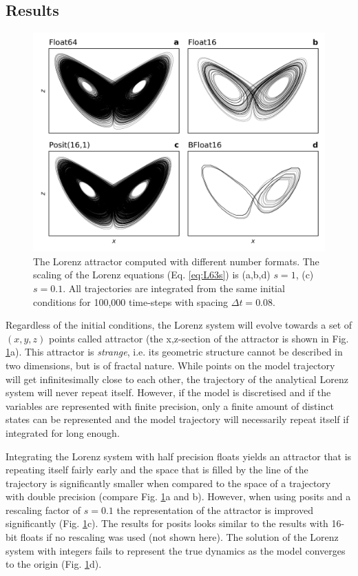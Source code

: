 \documentclass[draft]{agujournal2019}
\begin{document}
\subsection{Results}
\label{sec:lorenz}


\begin{figure}
\includegraphics[width=1\textwidth]{../plots/lorenz_attractor.png}
\caption{The Lorenz attractor computed with different number formats. The scaling of the Lorenz equations (Eq. \ref{eq:L63s}) is (a,b,d) $s=1$, (c) $s=0.1$. All trajectories are integrated from the same initial conditions for 100,000 time-steps with spacing $\Delta t = 0.08$.}
\label{fig:L63}
\end{figure}

Regardless of the initial conditions, the Lorenz system will evolve towards a set of $(x,y,z)$ points called attractor (the x,z-section of the attractor is shown in Fig. \ref{fig:L63}a). This attractor is \emph{strange}, i.e. its geometric structure cannot be described in two dimensions, but is of fractal nature. 
While points on the model trajectory will get infinitesimally close to each other, the trajectory of the analytical Lorenz system will never repeat itself. However, if the model is discretised and if the variables are represented with finite precision, only a finite amount of distinct states can be represented and the model trajectory will necessarily repeat itself if integrated for long enough. 

Integrating the Lorenz system with half precision floats yields an attractor that is repeating itself fairly early and the space that is filled by the line of the trajectory is significantly smaller when compared to the space of a trajectory with double precision (compare Fig. \ref{fig:L63}a and b). However, when using posits and a rescaling factor of $s=0.1$ the representation of the attractor is improved significantly (Fig. \ref{fig:L63}c). The results for posits looks similar to the results with 16-bit floats if no rescaling was used (not shown here). The solution of the Lorenz system with integers fails to represent the true dynamics as the model converges to the origin (Fig. \ref{fig:L63}d).
\end{document}
